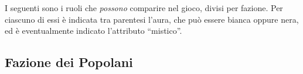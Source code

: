 \documentclass[a4paper,10pt]{article}
\begin{document}

I seguenti sono i ruoli che \emph{possono} comparire nel gioco, divisi per fazione. Per ciascuno di essi è indicata tra parentesi l'aura, che può essere bianca oppure nera, ed è eventualmente indicato l'attributo ``mistico''.

\subsection*{Fazione dei Popolani}
\end{document}
